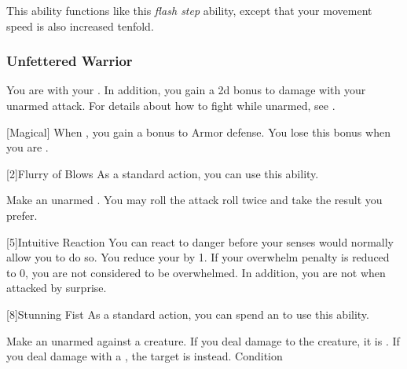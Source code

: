 
            This ability functions like this \textit{flash step} ability, except that your movement speed is also increased tenfold.

        \subsubsection{Unfettered Warrior}
            You are  with your .
            In addition, you gain a \plus2d bonus to damage with your unarmed attack.
            For details about how to fight while unarmed, see .

            [Magical]
            When \monkunencumbered, you gain a  bonus to Armor defense.
            You lose this bonus when you are \helpless.

            [2]{Flurry of Blows} As a standard action, you can use this ability.
            \begin{ability}
                \begin{spelleffects}
                    \spelleffect Make an unarmed .
                    You may roll the attack roll twice and take the result you prefer.
                \end{spelleffects}
            \end{ability}

            [5]{Intuitive Reaction} You can react to danger before your senses would normally allow you to do so.
            You reduce your  by 1.
            If your overwhelm penalty is reduced to 0, you are not considered to be overwhelmed.
            In addition, you are not \unaware when attacked by surprise.

            [8]{Stunning Fist} As a standard action, you can spend an  to use this ability.
            \begin{ability}
                \begin{spelleffects}
                    \spelleffect Make an unarmed  against a creature.
                    If you deal damage to the creature, it is \dazed.
                    If you deal damage with a , the target is \stunned instead.
                    \spelldur Condition
                \end{spelleffects}
            \end{ability}

